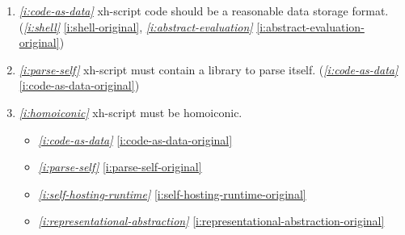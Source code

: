 \documentclass{report}
\makeatletter
\newcommand*{\Label}[2]{%
  \@bsphack
  \begingroup
    \label{#1-original}%
    \def\@currentlabel{#2}%
    \label{#1}%
  \endgroup
  \@esphack
}
\newcommand{\refboth}[1]{{\em \ref{#1}} \ref{#1-original}}
\makeatother
\begin{document}
\begin{enumerate}
\begin{itemize}
\item \refboth{i:laziness-serializable}
\end{itemize}
\item{}\Label{i:code-as-data}{code=data}{\em\ref{i:code-as-data}}
  xh-script code should be a reasonable data storage format.
(\refboth{i:shell}, \refboth{i:abstract-evaluation})
\item{}\Label{i:parse-self}{selfparse}{\em\ref{i:parse-self}}
  xh-script must contain a library to parse itself.
(\refboth{i:code-as-data})
\item{}\Label{i:homoiconic}{homoiconic}{\em\ref{i:homoiconic}}
  xh-script must be homoiconic.
\begin{itemize}
\item \refboth{i:code-as-data}
\item \refboth{i:parse-self}
\item \refboth{i:self-hosting-runtime}
\item \refboth{i:representational-abstraction}
\end{itemize}


\end{enumerate}
\end{document}
